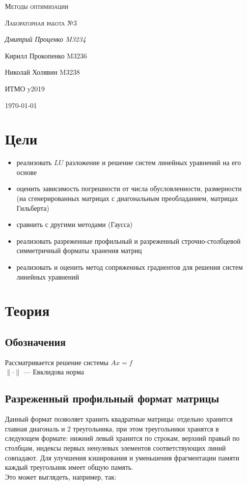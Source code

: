 \documentclass[russian, english]{article}
\begin{document}
\begin{titlepage}
\centering
	{\scshape\LARGE Методы оптимизации \par}
	\vspace{1cm}
	{\scshape\Large Лабораторная работа №3\par}
	\vspace{2cm}
	{\Large\itshape Дмитрий Проценко M3234 \par
	Кирилл Прокопенко M3236 \par
	Николай Холявин M3238 \par}
	\vfill
	ИТМО y2019
	\vfill
	{\large \today\par}
\end{titlepage}

\tableofcontents
\newpage

\section{Цели}
\begin{itemize}
	\item реализовать $LU$ разложение и решение систем линейных уравнений на его основе
	\item оценить зависимость погрешности от числа обусловленности, размерности (на сгенерированных матрицах с диагональным преобладанием, матрицах Гильберта)
	\item сравнить с другими методами (Гаусса)
	\item реализовать разреженные профильный и разреженный строчно-столбцевой симметричный форматы хранения матриц
	\item реализовать и оценить метод сопряженных градиентов для решения систем линейных уравнений
\end{itemize}
\section{Теория}
\subsection{Обозначения}
Рассматривается решение системы $Ax=f$ \\
$\|\cdot\|$ --- Евклидова норма
\subsection{Разреженный профильный формат матрицы}
Данный формат позволяет хранить квадратные матрицы: отдельно хранится главная диагональ и 2 треугольника, при этом треугольники хранятся в следующем формате: нижний левый хранится по строкам, верхний правый по столбцам, индексы первых ненулевых элементов соответствующих линий совпадают. Для улучшения кэширования и уменьшения фрагментации памяти каждый треугольник имеет общую память.\\
Это может выглядеть, например, так:
\end{document}
